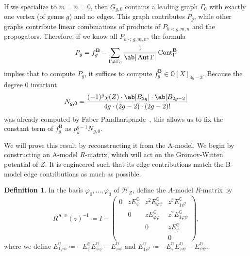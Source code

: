 \documentclass[10pt]{amsart}
\theoremstyle{definition}
\newtheorem{defn}[thm]{Definition}
\theoremstyle{remark}
\theoremstyle{plain}
\theoremstyle{definition}
\theoremstyle{remark}
\newcommand{\G}{\mathbb{G}}
\newcommand{\Q}{\mathbb{Q}}
\newcommand{\bA}{\mathbf{A}}
\newcommand{\bB}{\mathbf{B}}
\newcommand{\msc}[1]{\mathscr{#1}}
\newcommand{\on}[1]{\operatorname{#1}}
\newcommand{\1}{\mathbf{1}}
\newcommand{\2}{\mathbf{2}}
\newcommand{\3}{\mathbf{3}}
\DeclareMathOperator{\Aut}{Aut}
\numberwithin{equation}{section}
\begin{document}
If we specialize to $m=n=0$, then $G_{g,0}$ contains a leading graph $\Gamma_0$ with exactly one vertex (of genus $g$) and no edges. This graph contributes $P_g$, while other graphs contribute linear combinations of products of $P_{h<g,m,n}$ and the propogators. Therefore, if we know all $P_{h<g,m,n}$, the formula
\[ P_g = f_g^{\bB} - \sum_{\Gamma \neq \Gamma_0} \frac{1}{\ab|\Aut \Gamma|} \on{Cont}^{\bB}_{\Gamma} \]
implies that to compute $P_g$, it suffices to compute $f_g^{\bB} \in \Q[X]_{3g-3}$. Because the degree $0$ invariant
\[ N_{g,0} = \frac{(-1)^g \chi(Z) \cdot \ab|B_{2g}| \cdot \ab|B_{2g-2}|}{4g \cdot (2g-2) \cdot (2g-2)!} \]
was already computed by Faber-Pandharipande~\cite{gwhodge}, this allows us to fix the constant term of $f_g^{\bB}$ as $p_k^{g-1} N_{g,0}$.

We will prove this result by reconstructing it from the A-model. We begin by constructing an A-model $R$-matrix, which will act on the Gromov-Witten potential of $Z$. It is engineered such that its edge contributions match the B-model edge contributions as much as possible.
\begin{defn}
    In the basis $\varphi_0, \ldots, \varphi_3$ of $\msc{H}_Z$, define the $A$-model $R$-matrix by
    \[ R^{\bA,\G}(z)^{-1} \coloneqq I - \begin{pmatrix}
        0 & z E_{\psi}^{\G} & z^2 E_{\varphi\psi}^{\G} & z^3 E_{1\psi^2}^{\G} \\
        & 0 & z E_{\varphi\varphi}^{\G} & z^2 E_{1\varphi\psi}^{\G} \\
        & & 0 & z E_{\psi}^{\G} \\
        & & & 0
    \end{pmatrix},
    \]
    where we define $E_{1\varphi\psi}^{\G} \coloneqq -E_{\psi}^{\G} E_{\varphi\varphi}^{\G} - E_{\varphi\psi}^{\G}$ and $E_{1\psi^2}^{\G} \coloneqq -E_{\psi}^{\G} E_{\varphi\psi}^{\G} - E_{\psi\psi}^{\G}$.
\end{defn}
\end{document}
